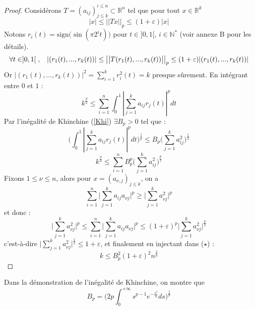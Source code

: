 \documentclass[12pt]{article}
\theoremstyle{definition}
\begin{document}
\begin{proof}
	Considérons $T=(a_{ij})^{i\leq n}_{j\leq k}\subset \mathbb{R}^n$ tel que pour tout $x\in\mathbb{R}^k$
	\begin{equation*}
	|x|\leq \big|\big|Tx\big|\big|_p\leq (1+\varepsilon) |x|
	\end{equation*}
	Notons $r_i(t)=\text{sign}\big(\sin (\pi 2^it)\big)$ pour $t\in]0,1[$, $i\in\mathbb{N}^*$ (voir annexe B pour les détails).
	\begin{equation*}
	\forall t\in]0,1[\hspace{1mm},\hspace{3mm}|(r_1(t),...,r_k(t))|\leq \big|\big|T(r_1(t),...,r_k(t))\big|\big|_p\leq (1+\varepsilon) |(r_1(t),...,r_k(t))|
	\end{equation*} 
	Or $|(r_1(t),...,r_k(t))|^2=\sum_{i=1}^{k}r_i^2(t)=k$ presque sûrement. En intégrant entre $0$ et $1$ :
	\begin{equation*}
	k^{\frac{p}{2}} \leq\sum_{i=1}^{n} \int_{0}^{1}|\sum_{j=1}^{k}a_{ij}r_j(t)|^pdt
	\end{equation*}
	Par l'inégalité de Khinchine (\cref{Khi}) $\exists B_p>0$ tel que :
	\begin{equation*}
	\big(\int_{0}^{1}|\sum_{j=1}^{k}a_{ij}r_j(t)|^pdt\big)^{\frac{1}{p}} \leq B_p\big(\sum_{j=1}^{k}a_{ij}^2\big)^{\frac{1}{2}}
	\end{equation*}
	\begin{equation*}\tag{$\star$}
	k^{\frac{p}{2}} \leq\sum_{i=1}^{n}B_p^p\big(\sum_{j=1}^{k}a_{ij}^2\big)^{\frac{p}{2}}
	\end{equation*}
	Fixons $1\leq \nu\leq n$, alors pour $x=(a_{\nu,j})_{j\leq k}$, on a
	\begin{equation*}
	\sum_{i=1}^{n}\big|\sum_{j=1}^{k}a_{ij}a_{\nu j}\big|^p\geq \big|\sum_{j=1}^{k}a_{\nu j}^2\big|^p
	\end{equation*}
	et donc :
	\begin{equation*}
	\big|\sum_{j=1}^{k}a_{\nu j}^2\big|^p\leq \sum_{i=1}^{n}\big|\sum_{j=1}^{k}a_{ij}a_{\nu j}\big|^p\leq (1+\varepsilon)^p \big|\sum_{j=1}^{k}a_{\nu j}^2\big|^\frac{p}{2}
	\end{equation*}
	c'est-à-dire $\big|\sum_{j=1}^{k}a_{\nu j}^2\big|^{\frac{1}{2}}\leq 1+\varepsilon$, et finalement en injectant dans ($\star$) :
	\begin{equation*}
	k \leq B_p^2(1+\varepsilon)^2 n^{\frac{2}{p}}
	\end{equation*}
\end{proof}
\begin{rem}
	Dans la démonstration de l'inégalité de Khinchine, on montre que 
	\begin{equation*}
	B_p= \big(2p\int_{0}^{+\infty}s^{p-1}e^{-\frac{s^2}{4}}ds\big)^{\frac{1}{p}}
	\end{equation*}
\end{rem}
\end{document}

